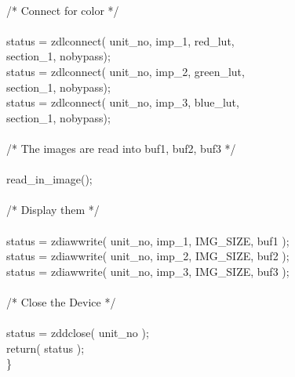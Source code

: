 \begin{tabbing}
\\
/*  Connect for color */\\
\\
\>status = zdlconnect( unit\_no, imp\_1, red\_lut,\\
\>\>\>\>\> section\_1, nobypass);\\
\>status = zdlconnect( unit\_no, imp\_2, green\_lut,\\
\>\>\>\>\> section\_1, nobypass);\\
\>status = zdlconnect( unit\_no, imp\_3, blue\_lut,\\
\>\>\>\>\> section\_1, nobypass);\\
\\
/*  The images are read into buf1, buf2, buf3 */\\
\\
\>read\_in\_image();\\
\\
/*  Display them */\\
\\
\>status = zdiawwrite( unit\_no, imp\_1, IMG\_SIZE, buf1 );\\
\>status = zdiawwrite( unit\_no, imp\_2, IMG\_SIZE, buf2 );\\
\>status = zdiawwrite( unit\_no, imp\_3, IMG\_SIZE, buf3 );\\
\\
/*  Close the Device */\\
\\
\>status = zddclose( unit\_no );\\
\>return( status );\\
\}\\
\end{tabbing}
\newpage
